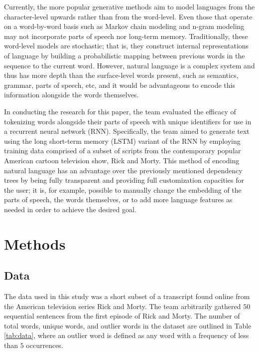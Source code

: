 \documentclass[conference]{IEEEtran}
\begin{document}
Currently, the more popular generative methods aim to model languages from the character-level upwards rather than from the word-level. Even those that operate on a word-by-word basis such as Markov chain modeling \cite{conroy2001text} and n-gram modeling \cite{masataki1996variable} may not incorporate parts of speech nor long-term memory. Traditionally, these word-level models are stochastic; that is, they construct internal representations of language by building a probabilistic mapping between previous words in the sequence to the current word. However, natural language is a complex system\cite{beckner2009language} and thus has more depth than the surface-level words present, such as semantics, grammar, parts of speech, etc, and it would be advantageous to encode this information alongside the words themselves.

In conducting the research for this paper, the team evaluated the efficacy of tokenizing words alongside their parts of speech with unique identifiers for use in a recurrent neural network (RNN). Specifically, the team aimed to generate text using the long short-term memory (LSTM) variant of the RNN by employing training data comprised of a subset of scripts from the contemporary popular American cartoon television show, Rick and Morty. This method of encoding natural language has an advantage over the previously mentioned dependency trees by being fully transparent and providing full customization capacities for the user; it is, for example, possible to manually change the embedding of the parts of speech, the words themselves, or to add more language features as needed in order to achieve the desired goal.

\section{Methods}

\subsection{Data}

The data used in this study was a short subset of a transcript found online\cite{rickandmorty} from the American television series Rick and Morty. The team arbitrarily gathered $50$ sequential sentences from the first episode of Rick and Morty. The number of total words, unique words, and outlier words in the dataset are outlined in Table \ref{tab:data}, where an outlier word is defined as any word with a frequency of less than $5$ occurrences.
\end{document}
